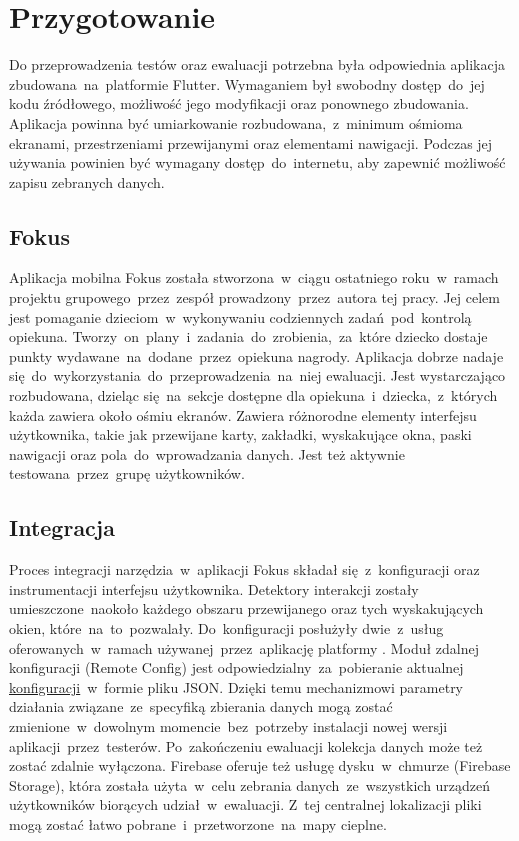 \section{Przygotowanie}
Do przeprowadzenia testów oraz ewaluacji potrzebna była odpowiednia aplikacja zbudowana~na~platformie Flutter. Wymaganiem był swobodny dostęp~do~jej kodu źródłowego, możliwość jego modyfikacji oraz ponownego zbudowania. Aplikacja powinna być umiarkowanie rozbudowana,~z~minimum ośmioma ekranami, przestrzeniami przewijanymi oraz elementami nawigacji. Podczas jej używania powinien być wymagany dostęp~do~internetu, aby zapewnić możliwość zapisu zebranych danych. 

\subsection{Fokus}
Aplikacja mobilna Fokus została stworzona~w~ciągu ostatniego roku~w~ramach projektu grupowego~przez~zespół prowadzony~przez~autora tej pracy. Jej celem jest pomaganie dzieciom~w~wykonywaniu codziennych zadań~pod~kontrolą opiekuna. Tworzy~on~plany~i~zadania~do~zrobienia,~za~które dziecko dostaje punkty wydawane~na~dodane~przez~opiekuna nagrody. Aplikacja dobrze nadaje się~do~wykorzystania~do~przeprowadzenia~na~niej ewaluacji. Jest wystarczająco rozbudowana, dzieląc się~na~sekcje dostępne dla opiekuna~i~dziecka,~z~których każda zawiera około ośmiu ekranów. Zawiera różnorodne elementy interfejsu użytkownika, takie jak przewijane karty, zakładki, wyskakujące okna, paski nawigacji oraz pola~do~wprowadzania danych. Jest też aktywnie testowana~przez~grupę użytkowników.

\subsection{Integracja}
Proces integracji narzędzia~w~aplikacji Fokus składał się~z~konfiguracji oraz instrumentacji interfejsu użytkownika. Detektory interakcji zostały umieszczone~naokoło każdego obszaru przewijanego oraz tych wyskakujących okien, które~na~to~pozwalały. Do~konfiguracji posłużyły dwie~z~usług oferowanych~w~ramach używanej~przez~aplikację platformy . Moduł zdalnej konfiguracji (Remote Config) jest odpowiedzialny~za~pobieranie aktualnej \hyperref[sec:rs_config]{konfiguracji}~w~formie pliku JSON. Dzięki temu mechanizmowi parametry działania związane~ze~specyfiką zbierania danych mogą zostać zmienione~w~dowolnym momencie~bez~potrzeby instalacji nowej wersji aplikacji~przez~testerów. Po~zakończeniu ewaluacji kolekcja danych może też zostać zdalnie wyłączona. Firebase oferuje też usługę dysku~w~chmurze (Firebase Storage), która została użyta~w~celu zebrania danych~ze~wszystkich urządzeń użytkowników biorących udział~w~ewaluacji. Z~tej centralnej lokalizacji pliki mogą zostać łatwo pobrane~i~przetworzone~na~mapy cieplne.
